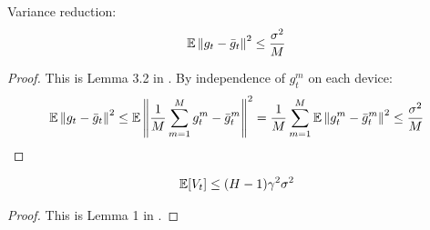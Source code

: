 \begin{lemma} \label{lem:var_red}
    Variance reduction:
    \begin{align}
        \E \norm{g_t - \bar{g}_t}^2 \leq \frac{\sigma^2}{M}
    \end{align}
\end{lemma}
\begin{proof} This is Lemma 3.2 in \cite{Stich}. By independence of $g^m_t$ on each device:
    \begin{align}
        \E \norm{g_t - \bar{g}_t}^2 \leq \E \norm{\fsumm{m=1}{M}{g^m_t - \bar{g}^m_t}}^2 
        = \fsumm{m=1}{M} \E \norm{g^m_t - \bar{g}^m_t}^2 \leq \frac{\sigma^2}{M}
    \end{align}
\end{proof}

\begin{lemma} \label{lem:lemma_Vt}
    \begin{align}
        \E [V_t] \leq (H-1) \gamma^2 \sigma^2
    \end{align}
\end{lemma}
\begin{proof}
    This is Lemma 1 in \cite{Khaled}.
\end{proof}